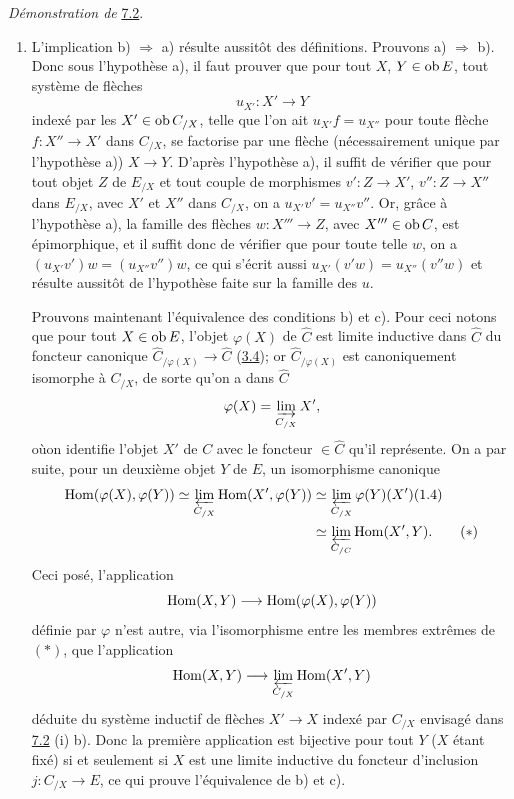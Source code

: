 \documentclass[10pt]{../fichiers-configuration-latex/smfart}
\def\labelenumi{(\theenumi)}
\begin{document}
\medskip
\noindent \emph{Démonstration de} \hyperref[I.prop7.2]{7.2}.
\begin{enumerate}
\renewcommand{\theenumi}{\roman{enumi}}
\renewcommand{\labelenumi}{(\theenumi)}
\item L'implication b) $\Rightarrow$ a) résulte aussitôt des
  définitions. Prouvons a) $\Rightarrow$ b). Donc sous
  l'hypothèse a), il faut prouver que pour tout $X$, $Y\in \operatorname{ob} E$,
  tout système de flèches
$$
u_{X'}:X'\longrightarrow Y
$$
indexé par les $X'\in \operatorname{ob} C_{/X}$, telle que l'on ait
$u_{X'}f=u_{X''}$ pour toute flèche $f:X''\rightarrow X'$ dans
$C_{/X}$, se factorise par une flèche (nécessairement unique par
l'hypothèse a)) $X\rightarrow Y$. D'après l'hypothèse a), il suffit
de vérifier que pour tout objet $Z$ de $E_{/X}$ et tout couple de
morphismes $v':Z\rightarrow X'$, $v'':Z\rightarrow X''$ dans
$E_{/X}$, avec $X'$ et $X''$ dans $C_{/X}$, on a
$u_{X'}v'=u_{X''}v''$. Or, grâce à l'hypothèse a), la famille des
flèches $w:X'''\rightarrow Z$, avec $X'''\in \operatorname{ob} C$, est
épimorphique, et il suffit donc de vérifier que pour toute telle
$w$, on a $(u_{X'}v')w=(u_{X''}v'')w$, ce qui s'écrit aussi
$u_{X'}(v'w)=u_{X''}(v''w)$ et résulte aussitôt de l'hypothèse faite
sur la famille des $u$.

Prouvons maintenant l'équivalence des conditions b) et c). Pour ceci
notons que pour tout $X\in \operatorname{ob} E$, l'objet $\varphi(X)$ de
$\widehat{C}$ est limite inductive dans $\widehat{C}$ du foncteur
canonique $\widehat{C}_{/\varphi(X)}\rightarrow \widehat{C}$ (\hyperref[I.prop3.4]{3.4});
or $\widehat{C}_{/\varphi(X)}$ est canoniquement isomorphe à
$C_{/X}$, de sorte qu'on a dans $\widehat{C}$
$$
\varphi(X)=\varinjlim_{C_{/X}}X'{},
$$
où\pageoriginale on identifie l'objet $X'$ de $C$ avec le foncteur
$\in \widehat{C}$ qu'il représente. On a par suite, pour un deuxième
objet $Y$ de $E$, un isomorphisme canonique
\begin{align*}
\Hom(\varphi(X),\varphi(Y))\simeq\varprojlim_{C_{/X}}
\Hom(X',\varphi(Y))&\simeq
\varprojlim_{C_{/X}}\varphi(Y)(X')(1.4)\\
&\simeq \varprojlim_{C_{/C}} \Hom(X'%
,Y){\quoi}.\tag{$\ast$}
\end{align*}
Ceci posé, l'application
$$
\operatorname{Hom}(X,Y)\longrightarrow \operatorname{Hom}(\varphi(X),\varphi(Y))
$$
définie par $\varphi$ n'est autre, via l'isomorphisme entre les
membres extrêmes de $(\ast)$, que l'application
$$
\operatorname{Hom}(X,Y)\longrightarrow \varprojlim_{C_{/X}} \operatorname{Hom}(X',Y)
$$
déduite du système inductif de flèches $X'\rightarrow X$ indexé par
$C_{/X}$ envisagé dans \hyperref[I.prop7.2]{7.2} (i) b). Donc la première
application est bijective pour tout $Y$ ($X$ étant fixé) si et
seulement si $X$ est une limite inductive du foncteur d'inclusion
$j:C_{/X}\rightarrow E$, ce qui prouve l'équivalence de b) et c).


\end{enumerate}
\end{document}
